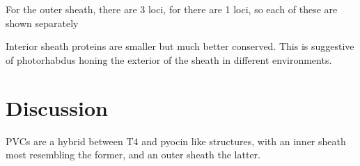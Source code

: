 For the outer sheath, there are 3 loci, for there are 1 loci, so each of these are shown separately



Interior sheath proteins are smaller but much better conserved. This is suggestive of photorhabdus honing the exterior of the sheath in different environments.




























\section{Discussion}
PVCs are a hybrid between T4 and pyocin like structures, with an inner sheath most resembling the former, and an outer sheath the latter.








